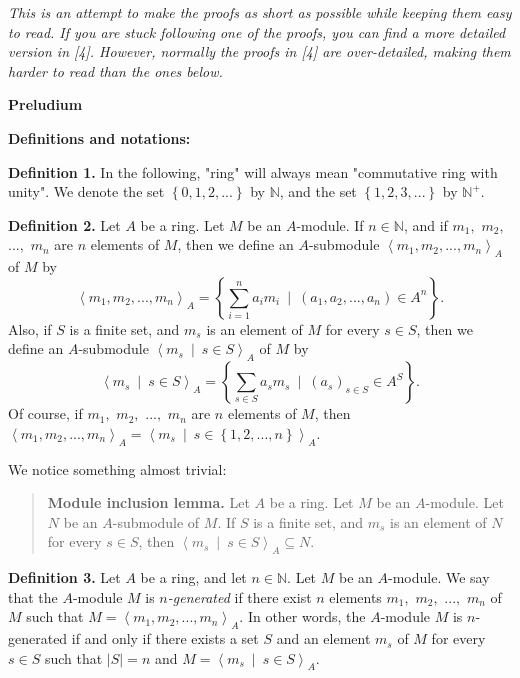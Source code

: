 \documentclass[12pt,final,notitlepage,onecolumn]{article}%
\begin{document}
\textit{This is an attempt to make the proofs as short as possible while
keeping them easy to read. If you are stuck following one of the proofs, you
can find a more detailed version in [4]. However, normally the proofs in [4]
are over-detailed, making them harder to read than the ones below.}

\begin{center}
\color{blue} \textbf{Preludium} \color{black}
\end{center}

\textbf{Definitions and notations:}

\textbf{Definition 1.} In the following, "ring" will always mean "commutative
ring with unity". We denote the set $\left\{  0,1,2,...\right\}  $ by
$\mathbb{N}$, and the set $\left\{  1,2,3,...\right\}  $ by $\mathbb{N}^{+}$.

\textbf{Definition 2.} Let $A$ be a ring. Let $M$ be an $A$-module. If
$n\in\mathbb{N}$, and if $m_{1},$ $m_{2},$ $...,$ $m_{n}$ are $n$ elements of
$M$, then we define an $A$-submodule $\left\langle m_{1},m_{2},...,m_{n}%
\right\rangle _{A}$ of $M$ by%
\[
\left\langle m_{1},m_{2},...,m_{n}\right\rangle _{A}=\left\{  \sum
\limits_{i=1}^{n}a_{i}m_{i}\ \mid\ \left(  a_{1},a_{2},...,a_{n}\right)  \in
A^{n}\right\}  .
\]
Also, if $S$ is a finite set, and $m_{s}$ is an element of $M$ for every $s\in
S$, then we define an $A$-submodule $\left\langle m_{s}\ \mid\ s\in
S\right\rangle _{A}$ of $M$ by%
\[
\left\langle m_{s}\ \mid\ s\in S\right\rangle _{A}=\left\{  \sum\limits_{s\in
S}a_{s}m_{s}\ \mid\ \left(  a_{s}\right)  _{s\in S}\in A^{S}\right\}  .
\]
Of course, if $m_{1},$ $m_{2},$ $...,$ $m_{n}$ are $n$ elements of $M$, then
$\left\langle m_{1},m_{2},...,m_{n}\right\rangle _{A}=\left\langle m_{s}%
\ \mid\ s\in\left\{  1,2,...,n\right\}  \right\rangle _{A}$.

We notice something almost trivial:

\begin{quote}
\textbf{Module inclusion lemma.} Let $A$ be a ring. Let $M$ be an $A$-module.
Let $N$ be an $A$-submodule of $M$. If $S$ is a finite set, and $m_{s}$ is an
element of $N$ for every $s\in S$, then $\left\langle m_{s}\ \mid\ s\in
S\right\rangle _{A}\subseteq N$.
\end{quote}

\textbf{Definition 3.} Let $A$ be a ring, and let $n\in\mathbb{N}$. Let $M$ be
an $A$-module. We say that the $A$-module $M$ is $n$\textit{-generated} if
there exist $n$ elements $m_{1},$ $m_{2},$ $...,$ $m_{n}$ of $M$ such that
$M=\left\langle m_{1},m_{2},...,m_{n}\right\rangle _{A}$. In other words, the
$A$-module $M$ is $n$-generated if and only if there exists a set $S$ and an
element $m_{s}$ of $M$ for every $s\in S$ such that $\left\vert S\right\vert
=n$ and $M=\left\langle m_{s}\ \mid\ s\in S\right\rangle _{A}$.
\end{document}
